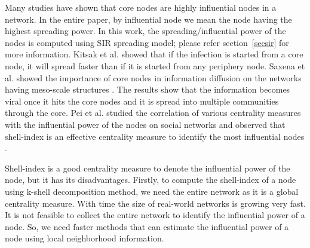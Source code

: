 \documentclass[conference]{IEEEtran}
\begin{document}
Many studies have shown that core nodes are highly influential nodes in a network. In the entire paper, by influential node we mean the node having the highest spreading power. In this work, the spreading/influential power of the nodes is computed using SIR spreading model; please refer section~\ref{secsir} for more information. Kitsak et al. \cite{kitsak2010identification} showed that if the infection is started from a core node, it will spread faster than if it is started from any periphery node. Saxena et al. showed the importance of core nodes in information diffusion on the networks having meso-scale structures \cite{saxena2015understanding}. The results show that the information becomes viral once it hits the core nodes and it is spread into multiple communities through the core. Pei et al. studied the correlation of various centrality measures with the influential power of the nodes on social networks and observed that shell-index is an effective centrality measure to identify the most influential nodes \cite{pei2014searching}. 

Shell-index is a good centrality measure to denote the influential power of the node, but it has its disadvantages. Firstly, to compute the shell-index of a node using k-shell decomposition method, we need the entire network as it is a global centrality measure. With time the size of real-world networks is growing very fast. It is not feasible to collect the entire network to identify the influential power of a node. So, we need faster methods that can estimate the influential power of a node using local neighborhood information. 

\end{document}
